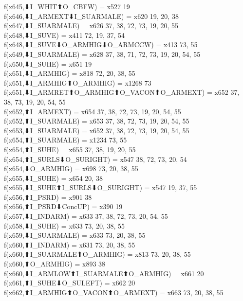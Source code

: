 f(x645,⬇I_WHIT⬆O_CBFW) = x527 {19} \\
f(x646,⬇I_ARMEXT⬇I_SUARMALE) = x620 {19, 20, 38} \\
f(x647,⬇I_SUARMALE) = x626 {37, 38, 72, 73, 19, 20, 55} \\
f(x648,⬇I_SUVE) = x411 {72, 19, 37, 54} \\
f(x648,⬇I_SUVE⬇O_ARMHIG⬇O_ARMCCW) = x413 {73, 55} \\
f(x649,⬇I_SUARMALE) = x628 {37, 38, 71, 72, 73, 19, 20, 54, 55} \\
f(x650,⬇I_SUHE) = x651 {19} \\
f(x651,⬇I_ARMHIG) = x818 {72, 20, 38, 55} \\
f(x651,⬇I_ARMHIG⬆O_ARMHIG) = x1268 {73} \\
f(x651,⬇I_ARMRET⬆O_ARMHIG⬆O_VACON⬆O_ARMEXT) = x652 {37, 38, 73, 19, 20, 54, 55} \\
f(x652,⬆I_ARMEXT) = x654 {37, 38, 72, 73, 19, 20, 54, 55} \\
f(x652,⬆I_SUARMALE) = x653 {37, 38, 72, 73, 19, 20, 54, 55} \\
f(x653,⬇I_SUARMALE) = x652 {37, 38, 72, 73, 19, 20, 54, 55} \\
f(x654,⬆I_SUARMALE) = x1234 {73, 55} \\
f(x654,⬆I_SUHE) = x655 {37, 38, 19, 20, 55} \\
f(x654,⬆I_SURLS⬇O_SURIGHT) = x547 {38, 72, 73, 20, 54} \\
f(x654,⬇O_ARMHIG) = x698 {73, 20, 38, 55} \\
f(x655,⬇I_SUHE) = x654 {20, 38} \\
f(x655,⬇I_SUHE⬆I_SURLS⬇O_SURIGHT) = x547 {19, 37, 55} \\
f(x656,⬆I_PSRD) = x901 {38} \\
f(x656,⬆I_PSRD⬇ConcUP) = x390 {19} \\
f(x657,⬇I_INDARM) = x633 {37, 38, 72, 73, 20, 54, 55} \\
f(x658,⬇I_SUHE) = x633 {73, 20, 38, 55} \\
f(x659,⬇I_SUARMALE) = x633 {73, 20, 38, 55} \\
f(x660,⬆I_INDARM) = x631 {73, 20, 38, 55} \\
f(x660,⬆I_SUARMALE⬆O_ARMHIG) = x813 {73, 20, 38, 55} \\
f(x660,⬆O_ARMHIG) = x893 {38} \\
f(x660,⬇I_ARMLOW⬆I_SUARMALE⬆O_ARMHIG) = x661 {20} \\
f(x661,⬆I_SUHE⬇O_SULEFT) = x662 {20} \\
f(x662,⬆I_ARMHIG⬆O_VACON⬆O_ARMEXT) = x663 {73, 20, 38, 55} \\
